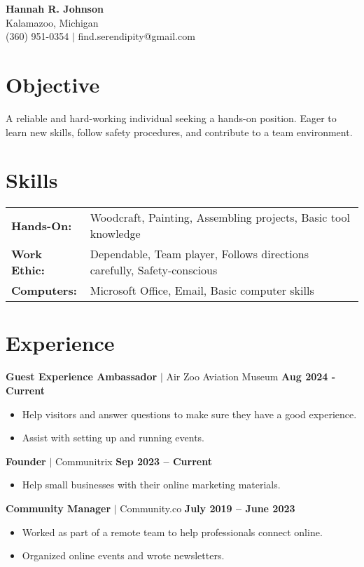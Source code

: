 \documentclass[a4paper,12pt]{article}
\begin{document}
\begin{center}
    {\Huge \textbf{Hannah R. Johnson}} \\
    \vspace{0.5em}
    Kalamazoo, Michigan \\
    (360) 951-0354 $|$ find.serendipity@gmail.com
\end{center}

\section*{Objective}
A reliable and hard-working individual seeking a hands-on position. Eager to learn new skills, follow safety procedures, and contribute to a team environment.

\section*{Skills}
\begin{tabularx}{\textwidth}{l X}
    \textbf{Hands-On:} & Woodcraft, Painting, Assembling projects, Basic tool knowledge \\
    \textbf{Work Ethic:} & Dependable, Team player, Follows directions carefully, Safety-conscious \\
    \textbf{Computers:} & Microsoft Office, Email, Basic computer skills \\
\end{tabularx}

\section*{Experience}

\textbf{Guest Experience Ambassador} $|$ Air Zoo Aviation Museum \hfill \textbf{Aug 2024 - Current}
\begin{itemize}[nosep, leftmargin=*]
    \item Help visitors and answer questions to make sure they have a good experience.
    \item Assist with setting up and running events.
\end{itemize}

\textbf{Founder} $|$ Communitrix \hfill \textbf{Sep 2023 – Current}
\begin{itemize}[nosep, leftmargin=*]
    \item Help small businesses with their online marketing materials.
\end{itemize}

\textbf{Community Manager} $|$ Community.co \hfill \textbf{July 2019 – June 2023}
\begin{itemize}[nosep, leftmargin=*]
    \item Worked as part of a remote team to help professionals connect online.
    \item Organized online events and wrote newsletters.
\end{itemize}
\end{document}
